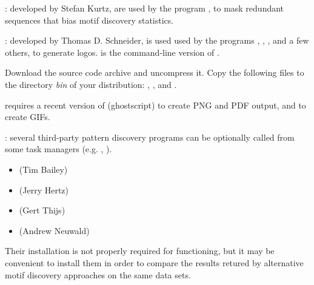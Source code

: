 \documentclass[12pt,a4paper, oneside]{scrreprt} %
\begin{document}
\begin{description}
\item[ and ]: developed by Stefan
  Kurtz, are used by the program , to mask
  redundant sequences that bias motif discovery statistics.

\item[]: developed by Thomas D. Schneider, is used
  used by the programs ,
  , ,
   and a few others, to generate
  logos.  is the command-line version of
  .

  Download the source code archive and uncompress it. Copy the
  following files to the directory \emph{bin} of your \RSAT
  distribution: , ,  and
  .

\item {} requires a recent version of 
  (ghostscript) to create PNG and
  PDF output, and  to create GIFs.

\item[matrix-based pattern discovery]: several third-party pattern
  discovery programs can be optionally called from some \RSAT task
  managers (e.g. ,
  ). 
  \begin{itemize}
  \item {} (Tim Bailey)
  \item {} (Jerry Hertz)
  \item {} (Gert Thijs)
  \item {} (Andrew Neuwald)
  \end{itemize}

  Their installation is not properly required for \RSAT functioning,
  but it may be convenient to install them in order to compare the
  results retured by alternative motif discovery approaches on the
  same data sets.
\end{description}
\end{document}
